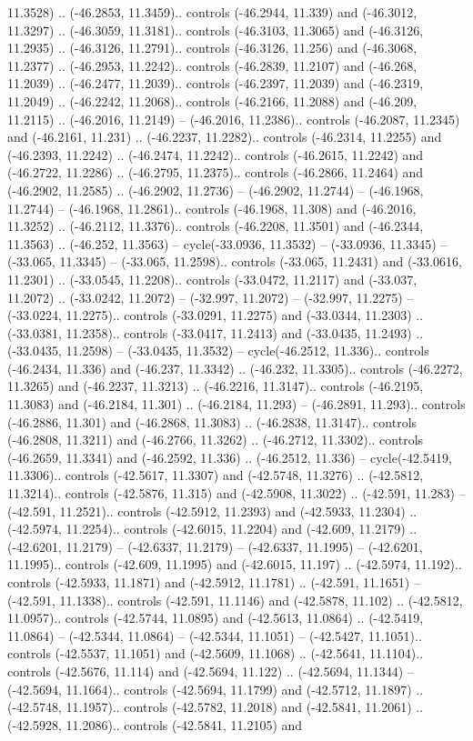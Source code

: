 \begin{scope}[shift={(2.5552, 9.9912)}]
\begin{scope}[shift={(48.1654, -14.8546)}]
11.3528) .. (-46.2853, 11.3459).. controls (-46.2944, 11.339) and (-46.3012, 11.3297) .. (-46.3059, 11.3181).. controls (-46.3103, 11.3065) and (-46.3126, 11.2935) .. (-46.3126, 11.2791).. controls (-46.3126, 11.256) and (-46.3068, 11.2377) .. (-46.2953, 11.2242).. controls (-46.2839, 11.2107) and (-46.268, 11.2039) .. (-46.2477, 11.2039).. controls (-46.2397, 11.2039) and (-46.2319, 11.2049) .. (-46.2242, 11.2068).. controls (-46.2166, 11.2088) and (-46.209, 11.2115) .. (-46.2016, 11.2149) -- (-46.2016, 11.2386).. controls (-46.2087, 11.2345) and (-46.2161, 11.231) .. (-46.2237, 11.2282).. controls (-46.2314, 11.2255) and (-46.2393, 11.2242) .. (-46.2474, 11.2242).. controls (-46.2615, 11.2242) and (-46.2722, 11.2286) .. (-46.2795, 11.2375).. controls (-46.2866, 11.2464) and (-46.2902, 11.2585) .. (-46.2902, 11.2736) -- (-46.2902, 11.2744) -- (-46.1968, 11.2744) -- (-46.1968, 11.2861).. controls (-46.1968, 11.308) and (-46.2016, 11.3252) .. (-46.2112, 11.3376).. controls (-46.2208, 11.3501) and (-46.2344, 11.3563) .. (-46.252, 11.3563) -- cycle(-33.0936, 11.3532) -- (-33.0936, 11.3345) -- (-33.065, 11.3345) -- (-33.065, 11.2598).. controls (-33.065, 11.2431) and (-33.0616, 11.2301) .. (-33.0545, 11.2208).. controls (-33.0472, 11.2117) and (-33.037, 11.2072) .. (-33.0242, 11.2072) -- (-32.997, 11.2072) -- (-32.997, 11.2275) -- (-33.0224, 11.2275).. controls (-33.0291, 11.2275) and (-33.0344, 11.2303) .. (-33.0381, 11.2358).. controls (-33.0417, 11.2413) and (-33.0435, 11.2493) .. (-33.0435, 11.2598) -- (-33.0435, 11.3532) -- cycle(-46.2512, 11.336).. controls (-46.2434, 11.336) and (-46.237, 11.3342) .. (-46.232, 11.3305).. controls (-46.2272, 11.3265) and (-46.2237, 11.3213) .. (-46.2216, 11.3147).. controls (-46.2195, 11.3083) and (-46.2184, 11.301) .. (-46.2184, 11.293) -- (-46.2891, 11.293).. controls (-46.2886, 11.301) and (-46.2868, 11.3083) .. (-46.2838, 11.3147).. controls (-46.2808, 11.3211) and (-46.2766, 11.3262) .. (-46.2712, 11.3302).. controls (-46.2659, 11.3341) and (-46.2592, 11.336) .. (-46.2512, 11.336) -- cycle(-42.5419, 11.3306).. controls (-42.5617, 11.3307) and (-42.5748, 11.3276) .. (-42.5812, 11.3214).. controls (-42.5876, 11.315) and (-42.5908, 11.3022) .. (-42.591, 11.283) -- (-42.591, 11.2521).. controls (-42.5912, 11.2393) and (-42.5933, 11.2304) .. (-42.5974, 11.2254).. controls (-42.6015, 11.2204) and (-42.609, 11.2179) .. (-42.6201, 11.2179) -- (-42.6337, 11.2179) -- (-42.6337, 11.1995) -- (-42.6201, 11.1995).. controls (-42.609, 11.1995) and (-42.6015, 11.197) .. (-42.5974, 11.192).. controls (-42.5933, 11.1871) and (-42.5912, 11.1781) .. (-42.591, 11.1651) -- (-42.591, 11.1338).. controls (-42.591, 11.1146) and (-42.5878, 11.102) .. (-42.5812, 11.0957).. controls (-42.5744, 11.0895) and (-42.5613, 11.0864) .. (-42.5419, 11.0864) -- (-42.5344, 11.0864) -- (-42.5344, 11.1051) -- (-42.5427, 11.1051).. controls (-42.5537, 11.1051) and (-42.5609, 11.1068) .. (-42.5641, 11.1104).. controls (-42.5676, 11.114) and (-42.5694, 11.122) .. (-42.5694, 11.1344) -- (-42.5694, 11.1664).. controls (-42.5694, 11.1799) and (-42.5712, 11.1897) .. (-42.5748, 11.1957).. controls (-42.5782, 11.2018) and (-42.5841, 11.2061) .. (-42.5928, 11.2086).. controls (-42.5841, 11.2105) and 
\end{scope}
\end{scope}
